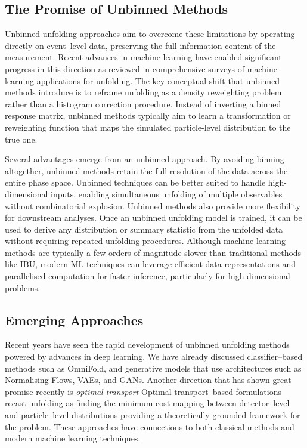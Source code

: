     \subsection{The Promise of Unbinned Methods}
        Unbinned unfolding approaches aim to overcome these limitations by operating directly on event--level data, preserving the full information content of the measurement.
        Recent advances in machine learning have enabled significant progress in this direction as reviewed in comprehensive surveys of machine learning applications for unfolding.
        The key conceptual shift that unbinned methods introduce is to reframe unfolding as a density reweighting problem rather than a histogram correction procedure.
        Instead of inverting a binned response matrix, unbinned methods typically aim to learn a transformation or reweighting function that maps the simulated particle-level distribution to the true one.

        Several advantages emerge from an unbinned approach.
        By avoiding binning altogether, unbinned methods retain the full resolution of the data across the entire phase space.
        Unbinned techniques can be better suited to handle high-dimensional inputs, enabling simultaneous unfolding of multiple observables without combinatorial explosion.
        Unbinned methods also provide more flexibility for downstream analyses.
        Once an unbinned unfolding model is trained, it can be used to derive any distribution or summary statistic from the unfolded data without requiring repeated unfolding procedures.
        Although machine learning methods are typically a few orders of magnitude slower than traditional methods like IBU, modern ML techniques can leverage efficient data representations and parallelised computation for faster inference, particularly for high-dimensional problems.
    \subsection{Emerging Approaches}
        Recent years have seen the rapid development of unbinned unfolding methods powered by advances in deep learning.
        We have already discussed classifier--based methods such as OmniFold, and generative models that use architectures such as Normalising Flows, VAEs, and GANs.
        Another direction that has shown great promise recently is \emph{optimal transport}
        Optimal transport--based formulations recast unfolding as finding the minimum cost mapping between detector--level and particle--level distributions providing a theoretically grounded framework for the problem.
        These approaches have connections to both classical methods and modern machine learning techniques.

